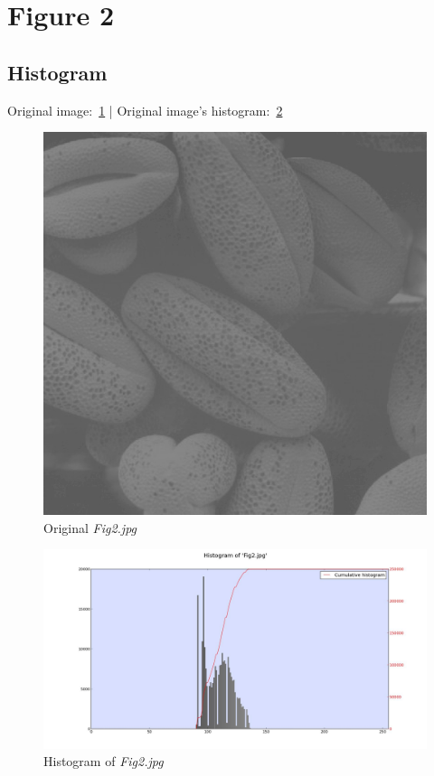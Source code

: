 \section{Figure 2}

    \subsection{Histogram}

    Original image:~\ref{diagram:fig2} |
    Original image's histogram:~\ref{diagram:hist_fig2}

    \begin{figure}[!htb]\centering
        \includegraphics[width=0.7\linewidth]{./images/1/Fig2.jpg}
        \caption{Original \textit{Fig2.jpg}}\label{diagram:fig2}
    \end{figure}

    \begin{figure}[!htb]\centering
        \includegraphics[width=\linewidth]{./images/1/Histogram_Fig2.jpg}
        \caption{Histogram of \textit{Fig2.jpg}}\label{diagram:hist_fig2}
    \end{figure}

